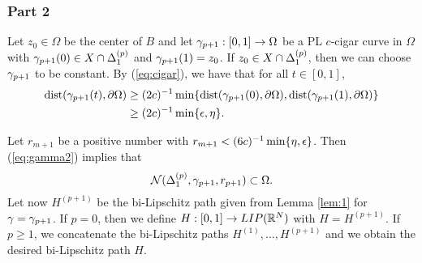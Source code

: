 \documentclass{amsart}
\DeclareMathOperator{\dist}{dist}
\begin{document}

\subsubsection{Part 2} 
Let $z_0\in \Omega$ be the center of $B$ and let $\gamma_{p+1} : [0,1] \to \Omega$ be a PL $c$-cigar curve in $\Omega$ with $\gamma_{p+1}(0) \in X \cap \Delta^{(p)}_1$ and $\gamma_{p+1}(1) =z_0$. If $z_0 \in X \cap \Delta^{(p)}_1$, then we can choose $\gamma_{p+1}$ to be constant. By (\ref{eq:cigar}), we have that for all $t\in [0,1]$, 
\begin{align}\label{eq:gamma2} 
\dist(\g_{p+1}(t),\partial\Omega) &\geq (2c)^{-1}\min\{\dist(\g_{p+1}(0),\partial\Omega),\dist(\g_{p+1}(1),\partial\Omega)\}\\
&\geq (2c)^{-1}\min\{\e,\eta\}. \notag%
\end{align}

Let $r_{m+1}$ be a positive number with $r_{m+1} < (6c)^{-1}\min\{\eta,\epsilon\}$. Then (\ref{eq:gamma2}) implies that 
\[ \mathcal{N}(\Delta_{1}^{(p)},\gamma_{p+1},r_{p+1}) \subset \Omega.\] 
Let now $H^{(p+1)}$ be the bi-Lipschitz path given from Lemma \ref{lem:1} for $\gamma = \gamma_{p+1}$. If $p=0$, then we define $H: [0,1] \to LIP(\mathbb{R}^N)$ with $H = H^{(p+1)}$. If $p\geq 1$, we concatenate the bi-Lipschitz paths $H^{(1)},\dots,H^{(p+1)}$ and we obtain the desired bi-Lipschitz path $H$.
\end{document}
